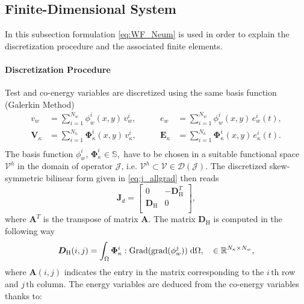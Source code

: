 \documentclass[letterpaper, 10 pt, conference]{ieeeconf}
\begin{document}
\subsection{Finite-Dimensional System}
\label{subsec:finPHs}
In this subsection formulation \eqref{eq:WF_Neum} is used in order to explain the discretization procedure and the associated finite elements. 
\paragraph{Discretization Procedure}
Test and co-energy variables are discretized using the same basis function (Galerkin Method)
\begin{equation}
\begin{aligned}
v_w &= \sum_{i = 1}^{N_w} \phi_w^i(x,y) \, v_w^i, \\
\bm{V}_\kappa &= \sum_{i = 1}^{N_\kappa} \bm\Phi_\kappa^i(x,y) \, v_\kappa^i,\\
\end{aligned} \qquad 
\begin{aligned}
e_w &= \sum_{i = 1}^{N_w} \phi_w^i(x,y) \, e_w^i(t), \\
\bm{E}_\kappa &= \sum_{i = 1}^{N_\kappa} \bm\Phi_\kappa^i(x,y) \, e_\kappa^i(t).\\
\end{aligned}
\end{equation}
The basis function $\phi_w^i, \, \bm\Phi_\kappa^i \in \mathbb{S}, $ have to be chosen in a suitable functional space $\mathcal{V}^h$ in the domain of operator $\mathcal{J}$, i.e. $\mathcal{V}^h \subset \mathcal{V} \in \mathcal{D}(\mathcal{J})$. The discretized skew-symmetric bilinear form given in \eqref{eq:j_allgrad} then reads
\begin{equation}
\bm{J}_d = 
\begin{bmatrix}
0 & -\bm{D}_{\mathrm{H}}^T \\
\bm{D}_{\mathrm{H}} & 0\\
\end{bmatrix},
\end{equation}
where $\bm{A}^T$ is the transpose of matrix $\bm{A}$. The matrix $\bm{D}_{\mathrm{H}}$ is computed in the following way
\begin{equation}
\bm{D}_{\mathrm{H}}(i,j) = \int_{\Omega} \bm{\Phi}_{\kappa}^i : \mathrm{Grad}(\mathrm{grad}(\phi_w^j)) \d\Omega, \quad \in \mathbb{R}^{N_\kappa \times N_w},
\end{equation}
where $\bm{A}(i,j)$ indicates the entry in the matrix corresponding to the $i \, {\text{th}}$ row and $j \,{\text{th}}$ column. The energy variables are deduced from the co-energy variables  thanks to:
\end{document}
